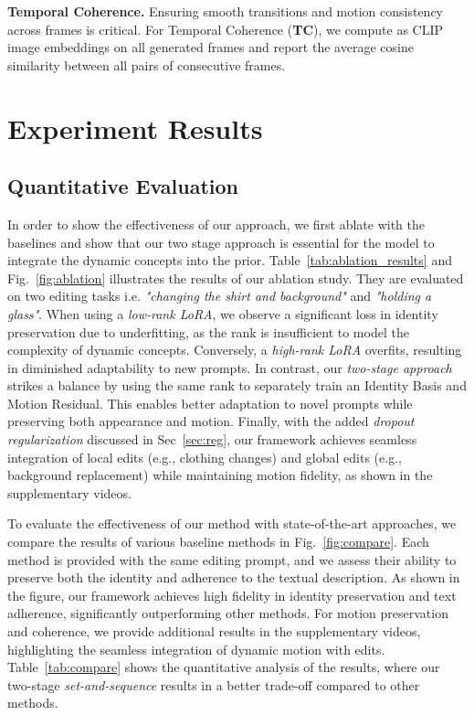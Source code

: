\textbf{Temporal Coherence.} Ensuring smooth transitions and motion consistency across frames is critical. For Temporal Coherence (\textbf{TC}), we compute  as CLIP image embeddings on all generated frames and report the average cosine similarity between all pairs of consecutive frames.


















\section{Experiment Results}

\subsection{Quantitative Evaluation}

In order to show the effectiveness of our approach, we first ablate with the baselines and show that our two stage approach is essential for the model to integrate the dynamic concepts into the prior.  Table~\ref{tab:ablation_results} and Fig.~\ref{fig:ablation} illustrates the results of our ablation study. They are evaluated on two editing tasks i.e. \textit{"changing the shirt and background"} and \textit{"holding a glass"}.  When using a \textit{low-rank LoRA}, we observe a significant loss in identity preservation due to underfitting, as the rank is insufficient to model the complexity of dynamic concepts. Conversely, a \textit{high-rank LoRA} overfits, resulting in diminished adaptability to new prompts. In contrast, our \textit{two-stage approach} strikes a balance by using the same rank to separately train an Identity Basis and Motion Residual. This enables better adaptation to novel prompts while preserving both appearance and motion. Finally, with the added \textit{dropout regularization} discussed in Sec~\ref{sec:reg}, our framework achieves seamless integration of local edits (e.g., clothing changes) and global edits (e.g., background replacement) while maintaining motion fidelity, as shown in the supplementary videos.

To evaluate the effectiveness of our method with state-of-the-art approaches, we compare the results of various baseline methods in Fig.~\ref{fig:compare}. Each method is provided with the same editing prompt, and we assess their ability to preserve both the identity and adherence to the textual description. As shown in the figure, our framework achieves high fidelity in identity preservation and text adherence, significantly outperforming other methods. For motion preservation and coherence, we provide additional results in the supplementary videos, highlighting the seamless integration of dynamic motion with edits. Table~\ref{tab:compare} shows the quantitative analysis of the results, where our two-stage \textit{set-and-sequence} results in a better trade-off compared to other methods.
